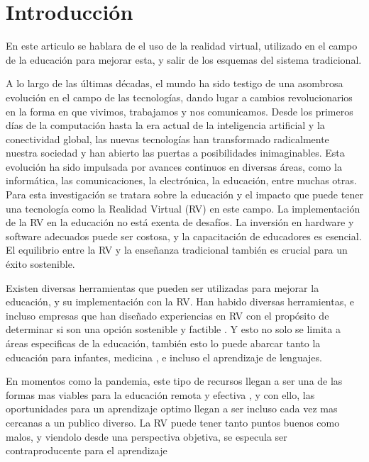 \section{Introducción}

En este articulo se hablara de el uso de la realidad virtual, utilizado en el campo de la educación para mejorar esta, y salir de los esquemas del sistema tradicional.

A lo largo de las últimas décadas, el mundo ha sido testigo de una asombrosa evolución en el campo de las tecnologías, dando lugar a cambios revolucionarios en la forma en que vivimos, trabajamos y nos comunicamos. Desde los primeros días de la computación hasta la era actual de la inteligencia artificial y la conectividad global, las nuevas tecnologías han transformado radicalmente nuestra sociedad y han abierto las puertas a posibilidades inimaginables. Esta evolución ha sido impulsada por avances continuos en diversas áreas, como la informática, las comunicaciones, la electrónica, la educación, entre muchas otras. Para esta investigación se tratara sobre la educación y el impacto que puede tener una tecnología como la Realidad Virtual (RV) en este campo. La implementación de la RV en la educación no está exenta de desafíos. La inversión en hardware y software adecuados puede ser costosa, y la capacitación de educadores es esencial. El equilibrio entre la RV y la enseñanza tradicional también es crucial para un éxito sostenible.

Existen diversas herramientas que pueden ser utilizadas para mejorar la educación, y su implementación con la RV. Han habido diversas herramientas, e incluso empresas que han diseñado experiencias en RV con el propósito de determinar si son una opción sostenible y factible \parencite{SHIM2023100010}. Y esto no solo se limita a áreas especificas de la educación, también esto lo puede abarcar tanto la educación para infantes, medicina \parencite{GUERRERO2022100002}, e incluso el aprendizaje de lenguajes. \parencite{YUDINTSEVA2023100018, ZAMMIT2023100035}

En momentos como la pandemia, este tipo de recursos llegan a ser una de las formas mas viables para la educación remota y efectiva \parencite{GUERRERO2022100002}, y con ello, las oportunidades para un aprendizaje optimo llegan a ser incluso cada vez mas cercanas a un publico diverso. La RV puede tener tanto puntos buenos como malos, y viendolo desde una perspectiva objetiva, se especula ser contraproducente para el aprendizaje \parencite{OJE2023100033}





